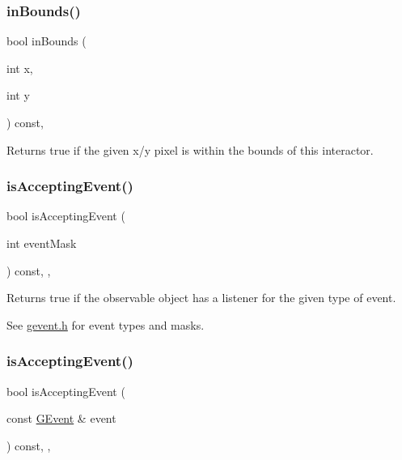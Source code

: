 \subsubsection{\texorpdfstring{in\+Bounds()}{inBounds()}\hspace{0.1cm}{\footnotesize\ttfamily [2/2]}}
{\footnotesize\ttfamily bool in\+Bounds (\begin{DoxyParamCaption}\item[{int}]{x,  }\item[{int}]{y }\end{DoxyParamCaption}) const\hspace{0.3cm}{\ttfamily [virtual]}, {\ttfamily [inherited]}}



Returns true if the given x/y pixel is within the bounds of this interactor. 

\mbox{\label{classsgl_1_1GObservable_aeec1adc19aa0f33de62390686ee1382c}} 
\subsubsection{\texorpdfstring{is\+Accepting\+Event()}{isAcceptingEvent()}\hspace{0.1cm}{\footnotesize\ttfamily [1/3]}}
{\footnotesize\ttfamily bool is\+Accepting\+Event (\begin{DoxyParamCaption}\item[{int}]{event\+Mask }\end{DoxyParamCaption}) const\hspace{0.3cm}{\ttfamily [protected]}, {\ttfamily [virtual]}, {\ttfamily [inherited]}}



Returns true if the observable object has a listener for the given type of event. 

See \mbox{\hyperlink{gevent_8h_source}{gevent.\+h}} for event types and masks. \mbox{\label{classsgl_1_1GObservable_aa31c73145a29dcb92848a92e0cfaea41}} 
\subsubsection{\texorpdfstring{is\+Accepting\+Event()}{isAcceptingEvent()}\hspace{0.1cm}{\footnotesize\ttfamily [2/3]}}
{\footnotesize\ttfamily bool is\+Accepting\+Event (\begin{DoxyParamCaption}\item[{const \mbox{\hyperlink{classsgl_1_1GEvent}{G\+Event}} \&}]{event }\end{DoxyParamCaption}) const\hspace{0.3cm}{\ttfamily [protected]}, {\ttfamily [virtual]}, {\ttfamily [inherited]}}



